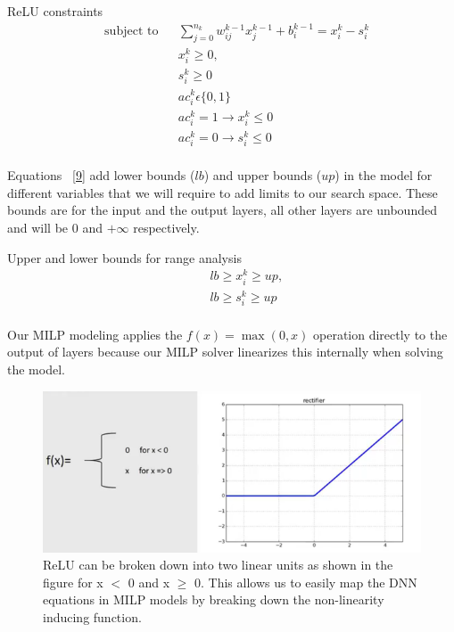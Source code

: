 ReLU constraints
\begin{equation}
\label{8}
\begin{aligned}
& \text{subject to} & &  \sum_{j=0}^{n_k} w_{ij}^{k-1}x_{j}^{k-1} + b_i^{k-1} = x_i^k - s_i^k  \\
& & & x_i^k \geq 0, \\
& & & s_i^k \geq 0 \\
& & & ac_i^k  \epsilon  \{0,1\} \\
& & & ac_i^k  =  1 \rightarrow  x_i^k \leq 0  \\
& & & ac_i^k =  0 \rightarrow s_i^k  \leq 0   \\
\end{aligned}
\end{equation}

Equations ~\ref{9} add lower bounds ($lb$) and upper bounds ($up$) in the  model for different variables that we will  require to add limits to our search space. 
These bounds are for the input and the output layers, all other layers are unbounded and will be 0 and $+\infty$ respectively. 
 
Upper and lower bounds for range analysis
\begin{equation}
\label{9}
\begin{aligned}
& & & lb \geq x_i^k \geq up, \\
& & &  lb \geq s_i^k \geq up \\
\end{aligned}
\end{equation}








Our MILP modeling applies the $f(x) = \max(0, x)$ operation directly to the output of layers because our MILP solver linearizes this internally when solving the model.





\begin{figure}
	\centering
	\includegraphics[width=0.7\linewidth]{Images/ReLUbreakdown}
	\caption{ReLU can be broken down into two linear units as shown in the figure for x $<$ 0 and x $\geq$ 0. This allows us to easily map the DNN equations in MILP models by breaking down the non-linearity inducing function.}
	\label{fig:relubreakdown}
\end{figure}

